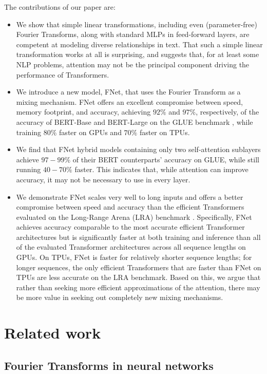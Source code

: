 \documentclass[11pt]{article}
\begin{document}
The contributions of our paper are:
\begin{itemize}
    \item We show that simple linear transformations, including even (parameter-free) Fourier Transforms, along with standard MLPs in feed-forward layers, are competent at modeling diverse relationships in text. That such a simple linear transformation works at all is surprising, and suggests that, for at least some NLP problems, attention may not be the principal component driving the performance of Transformers.
    \item We introduce a new model, FNet, that uses the Fourier Transform as a mixing mechanism.  FNet offers an excellent compromise between speed, memory footprint, and accuracy, achieving $92\%$ and $97\%$, respectively, of the accuracy of BERT-Base and BERT-Large \citep{devlin2018bert} on the GLUE benchmark \citep{wang2018glue}, while training $80\%$ faster on GPUs and $70\%$ faster on TPUs. 
    \item We find that FNet hybrid models containing only two self-attention sublayers achieve $97-99\%$ of their BERT counterparts' accuracy on GLUE, while still running $40-70\%$ faster. This indicates that, while attention can improve accuracy, it may not be necessary to use in every layer.
    \item We demonstrate FNet scales very well to long inputs and offers a better compromise between speed and accuracy than the efficient Transformers evaluated on the Long-Range Arena (LRA) benchmark \citep{tay2020long}.
    Specifically, FNet achieves accuracy comparable to the most accurate efficient Transformer architectures but is significantly faster at both training and inference than all of the evaluated Transformer architectures across all sequence lengths on GPUs. On TPUs, FNet is faster for relatively shorter sequence lengths; for longer sequences, the only efficient Transformers that are faster than FNet on TPUs are less accurate on the LRA benchmark.
    Based on this, we argue that rather than seeking more efficient approximations of the attention, there may be more value in seeking out completely new mixing mechanisms.
\end{itemize}
 \section{Related work}
\label{sec:related_work}

\subsection{Fourier Transforms in neural networks}
\label{subsec:fourier_transforms_neural_networks}
\end{document}
